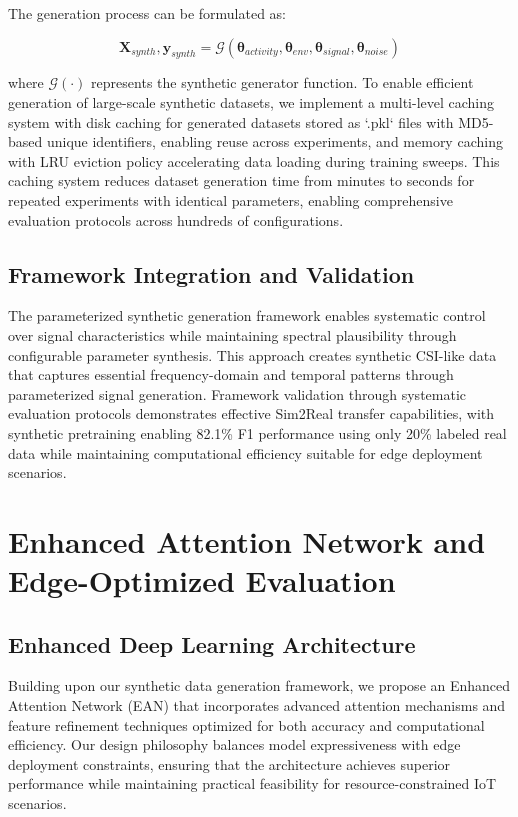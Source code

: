\documentclass[journal]{IEEEtran}
\begin{document}
The generation process can be formulated as:

\begin{equation}
\mathbf{X}_{synth}, \mathbf{y}_{synth} = \mathcal{G}(\boldsymbol{\theta}_{activity}, \boldsymbol{\theta}_{env}, \boldsymbol{\theta}_{signal}, \boldsymbol{\theta}_{noise})
\end{equation}

where $\mathcal{G}(\cdot)$ represents the synthetic generator function. To enable efficient generation of large-scale synthetic datasets, we implement a multi-level caching system with disk caching for generated datasets stored as `.pkl` files with MD5-based unique identifiers, enabling reuse across experiments, and memory caching with LRU eviction policy accelerating data loading during training sweeps. This caching system reduces dataset generation time from minutes to seconds for repeated experiments with identical parameters, enabling comprehensive evaluation protocols across hundreds of configurations.

\subsection{Framework Integration and Validation}

The parameterized synthetic generation framework enables systematic control over signal characteristics while maintaining spectral plausibility through configurable parameter synthesis. This approach creates synthetic CSI-like data that captures essential frequency-domain and temporal patterns through parameterized signal generation. Framework validation through systematic evaluation protocols demonstrates effective Sim2Real transfer capabilities, with synthetic pretraining enabling 82.1\% F1 performance using only 20\% labeled real data while maintaining computational efficiency suitable for edge deployment scenarios.

\section{Enhanced Attention Network and Edge-Optimized Evaluation}

\subsection{Enhanced Deep Learning Architecture}

Building upon our synthetic data generation framework, we propose an Enhanced Attention Network (EAN) that incorporates advanced attention mechanisms and feature refinement techniques optimized for both accuracy and computational efficiency. Our design philosophy balances model expressiveness with edge deployment constraints, ensuring that the architecture achieves superior performance while maintaining practical feasibility for resource-constrained IoT scenarios.
\end{document}
